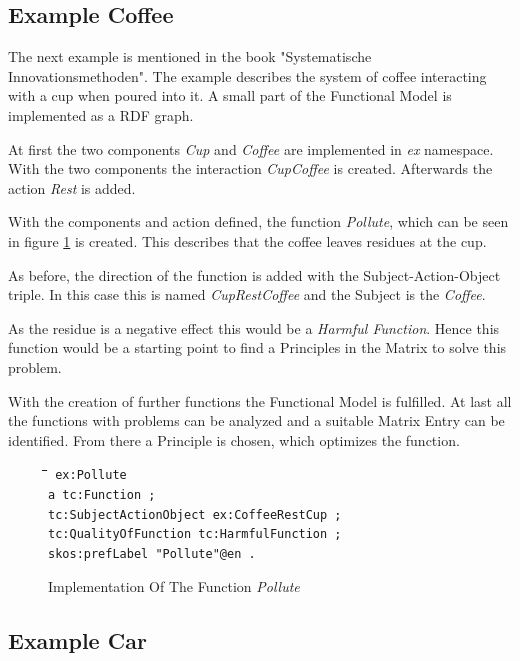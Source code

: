 \documentclass[11pt,a4paper]{article}
\newenvironment{code}{\tt \begin{tabbing}
\hskip12pt\=\hskip12pt\=\hskip12pt\=\hskip12pt\=\hskip5cm\=\hskip5cm\=\kill}
{\end{tabbing}}
\begin{document}
\subsection{Example Coffee}

The next example is mentioned in the book "Systematische Innovationsmethoden".
The example describes the system of coffee interacting with a cup when poured
into it.  A small part of the Functional Model is implemented as a RDF graph.

At first the two components \emph{Cup} and \emph{Coffee} are implemented in
\emph{ex} namespace.  With the two components the interaction \emph{CupCoffee}
is created.  Afterwards the action \emph{Rest} is added.

With the components and action defined, the function \emph{Pollute}, which can
be seen in figure \ref{fig:implementation_function_pollute} is created.  This
describes that the coffee leaves residues at the cup.

As before, the direction of the function is added with the
Subject-Action-Object triple.  In this case this is named \emph{CupRestCoffee}
and the Subject is the \emph{Coffee}.

As the residue is a negative effect this would be a \emph{Harmful Function}.
Hence this function would be a starting point to find a Principles in the
Matrix to solve this problem.

With the creation of further functions the Functional Model is fulfilled.  At
last all the functions with problems can be analyzed and a suitable Matrix
Entry can be identified.  From there a Principle is chosen, which optimizes
the function.

\begin{figure}[ht]
  \centering
  \begin{code}\tt
    ex:Pollute\\
    \> a tc:Function ;\\
    \> tc:SubjectActionObject ex:CoffeeRestCup ;\\
    \> tc:QualityOfFunction tc:HarmfulFunction ;\\
    \> skos:prefLabel "Pollute"@en .\\
  \end{code}
  \caption{Implementation Of The Function \emph{Pollute}}
  \label{fig:implementation_function_pollute}
\end{figure}

\subsection{Example Car}
\end{document}

